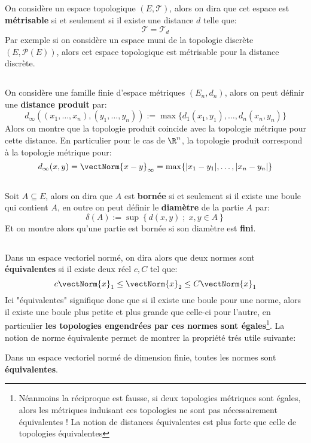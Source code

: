 \subsection*{}
On considère un espace topologique \((E, \mathcal{T})\), alors on dira que cet espace est \textbf{métrisable} si et seulement si il existe une distance \(d\) telle que:
\[
   \mathcal{T} = \mathcal{T}_d
\]
Par exemple si on considère un espace muni de la topologie discrète \((E, \mathcal{P}(E))\), alors cet espace topologique est métrisable pour la distance discrète.
\subsection*{}
On considère une famille finie d'espace métriques \((E_n, d_n)\), alors on peut définir une \textbf{distance produit} par:
\[
   d_\infty((x_1, \ldots, x_n), (y_1, \ldots, y_n)) := \max\{d_1(x_1, y_1), \ldots, d_n(x_n, y_n)\}
\]
Alors on montre que la topologie produit coincide avec la topologie métrique pour cette distance. En particulier pour le cas de \(\R^n\), la topologie produit correspond à la topologie métrique pour:
\[
   d_\infty(x, y) = \vectNorm{x - y}_\infty = \max\{|x_1 - y_1|, \ldots, |x_n - y_n|\}
\]
\subsection*{}
Soit \( A \subseteq E\), alors on dira que \( A \) est \textbf{bornée} si et seulement si il existe une boule qui contient \( A \), en outre on peut définir le \textbf{diamètre} de la partie \( A \) par:
\[ 
   \delta(A) := \sup \left\{ d(x, y) \; ; \; x, y \in A \right\}  
\]
Et on montre alors qu'une partie est bornée si son diamètre est \textbf{fini}.
\subsection*{}
Dans un espace vectoriel normé, on dira alors que deux normes sont \textbf{équivalentes} si il existe deux réel \(c, C\) tel que:
\[
   c\vectNorm{x}_1 \leq \vectNorm{x}_2 \leq C\vectNorm{x}_1
\]
Ici "équivalentes" signifique donc que si il existe une boule pour une norme, alors il existe une boule plus petite et plus grande que celle-ci pour l'autre, en particulier \textbf{les topologies engendrées par ces normes sont égales}\footnote[1]{Néanmoins la réciproque est fausse, si deux topologies métriques sont égales, alors les métriques induisant ces topologies ne sont pas nécessairement équivalentes ! La notion de distances équivalentes est plus forte que celle de topologies équivalentes}.\+
La notion de norme équivalente permet de montrer la propriété trés utile suivante:
\begin{center}
   Dans un espace vectoriel normé de dimension finie, toutes les normes sont \textbf{équivalentes}.
\end{center}
